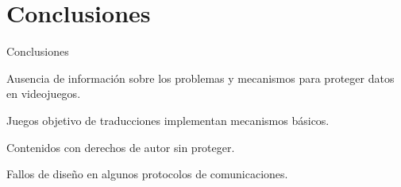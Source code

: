 
\section{Conclusiones}
\begin{frame}{Conclusiones}
\begin{center}
Ausencia de información sobre los problemas y mecanismos para proteger datos en videojuegos.
\end{center}

\begin{wideitemize}
    \item<2-> Juegos objetivo de traducciones implementan mecanismos básicos.

    \item<3-> Contenidos con derechos de autor sin proteger.

    \item<4-> Fallos de diseño en algunos protocolos de comunicaciones.
\end{wideitemize}
\end{frame}
